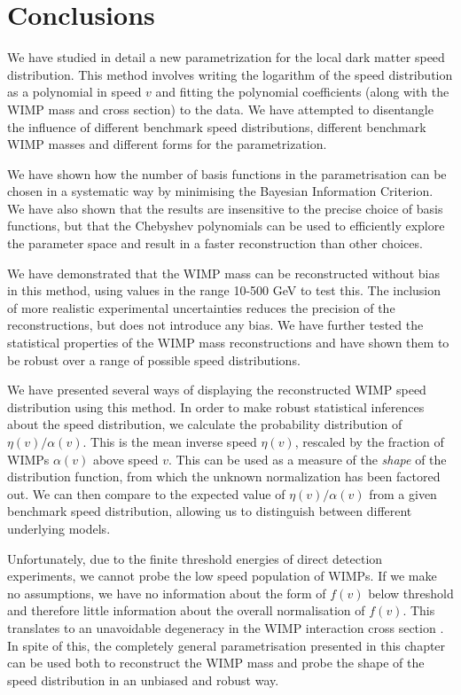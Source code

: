 \section{Conclusions}
\label{sec:Poly:conclusions}


We have studied in detail a new parametrization for the local dark matter speed distribution. This method involves writing the logarithm of the speed distribution as a polynomial in speed $v$ and fitting the polynomial coefficients (along with the WIMP mass and cross section) to the data. We have attempted to disentangle the influence of  different benchmark speed distributions, different benchmark WIMP masses and different forms for the parametrization.

We have shown how the number of basis functions in the parametrisation can be chosen in a systematic way by minimising the Bayesian Information Criterion. We have also shown that the results are insensitive to the precise choice of basis functions, but that the Chebyshev polynomials can be used to efficiently explore the parameter space and result in a faster reconstruction than other choices.

We have demonstrated that the WIMP mass can be reconstructed without bias in this method, using values in the range 10-500 GeV to test this. The inclusion of more realistic experimental uncertainties reduces the precision of the reconstructions, but does not introduce any bias. We have further tested the statistical properties of the WIMP mass reconstructions and have shown them to be robust over a range of possible speed distributions.

 We have presented several ways of displaying the reconstructed WIMP speed distribution using this method. In order to make robust statistical inferences about the speed distribution, we calculate the probability distribution of $\eta(v)/\alpha(v)$. This is the mean inverse speed $\eta(v)$, rescaled by the fraction of WIMPs $\alpha(v)$ above speed $v$. This can be used as a measure of the \textit{shape} of the distribution function, from which the unknown normalization has been factored out. We can then compare to the expected value of $\eta(v)/\alpha(v)$ from a given benchmark speed distribution, allowing us to distinguish between different underlying models.

Unfortunately, due to the finite threshold energies of direct detection experiments, we cannot probe the low speed population of WIMPs. If we make no assumptions, we have no information about the form of $f(v)$ below threshold and therefore little information about the overall normalisation of $f(v)$. This translates to an unavoidable degeneracy in the WIMP interaction cross section \sigmapsi. In spite of this, the completely general parametrisation presented in this chapter can be used both to reconstruct the WIMP mass and probe the shape of the speed distribution in an unbiased and robust way.

